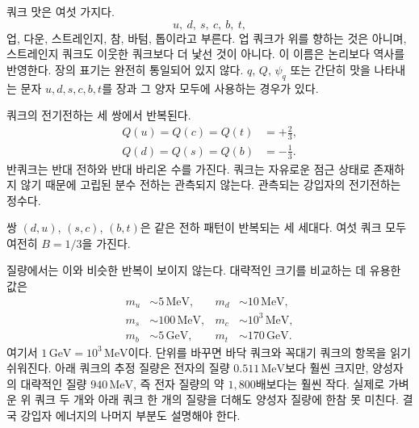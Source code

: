 쿼크 맛은 여섯 가지다.
\begin{equation}
u,\ d,\ s,\ c,\ b,\ t,
\end{equation}
업, 다운, 스트레인지, 참, 바텀, 톱이라고 부른다. 업 쿼크가 위를 향하는 것은 아니며, 스트레인지 쿼크도 이웃한 쿼크보다 더 낯선 것이 아니다. 이 이름은 논리보다 역사를 반영한다. 장의 표기는 완전히 통일되어 있지 않다. \(q\), \(Q\), \(\psi_q\) 또는 간단히 맛을 나타내는 문자 \(u,d,s,c,b,t\)를 장과 그 양자 모두에 사용하는 경우가 있다.

\begin{classroomqa}
\end{classroomqa}

쿼크의 전기전하는 세 쌍에서 반복된다.
\begin{equation}
\begin{aligned}
Q(u)=Q(c)=Q(t)&=+\frac23,
\\
Q(d)=Q(s)=Q(b)&=-\frac13.
\end{aligned}
\end{equation}
반쿼크는 반대 전하와 반대 바리온 수를 가진다. 쿼크는 자유로운 점근 상태로 존재하지 않기 때문에 고립된 분수 전하는 관측되지 않는다. 관측되는 강입자의 전기전하는 정수다.

쌍 \((d,u)\), \((s,c)\), \((b,t)\)은 같은 전하 패턴이 반복되는 세 세대다. 여섯 쿼크 모두 여전히 \(B=1/3\)을 가진다.

\begin{classroomqa}
\end{classroomqa}

질량에서는 이와 비슷한 반복이 보이지 않는다. 대략적인 크기를 비교하는 데 유용한 값은
\begin{align}
m_u &\sim 5\,\mathrm{MeV},
&
m_d &\sim 10\,\mathrm{MeV},
\\
m_s &\sim 100\,\mathrm{MeV},
&
m_c &\sim 10^3\,\mathrm{MeV},
\\
m_b &\sim 5\,\mathrm{GeV},
&
m_t &\sim 170\,\mathrm{GeV}.
\end{align}
여기서 \(1\,\mathrm{GeV}=10^3\,\mathrm{MeV}\)이다. 단위를 바꾸면 바닥 쿼크와 꼭대기 쿼크의 항목을 읽기 쉬워진다. 아래 쿼크의 추정 질량은 전자의 질량 \(0.511\,\mathrm{MeV}\)보다 훨씬 크지만, 양성자의 대략적인 질량 \(940\,\mathrm{MeV}\), 즉 전자 질량의 약 \(1{,}800\)배보다는 훨씬 작다. 실제로 가벼운 위 쿼크 두 개와 아래 쿼크 한 개의 질량을 더해도 양성자 질량에 한참 못 미친다. 결국 강입자 에너지의 나머지 부분도 설명해야 한다.

